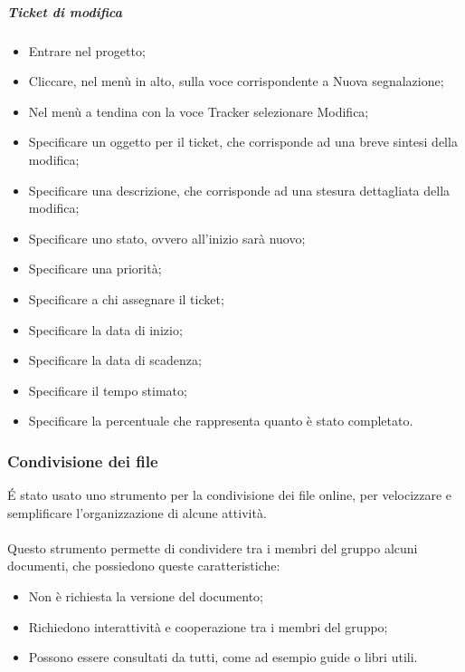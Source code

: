 \subparagraph{Ticket di modifica}
\begin{itemize}
\item Entrare nel progetto;
\item Cliccare, nel menù in alto, sulla voce corrispondente a Nuova segnalazione;
\item Nel menù a tendina con la voce Tracker selezionare Modifica;
\item Specificare un oggetto per il ticket, che corrisponde ad una breve sintesi della modifica;
\item Specificare una descrizione, che corrisponde ad una stesura dettagliata della modifica;
\item Specificare uno stato, ovvero all'inizio sarà nuovo;
\item Specificare una priorità;
\item Specificare a chi assegnare il ticket;
\item Specificare la data di inizio;
\item Specificare la data di scadenza;
\item Specificare il tempo stimato;
\item Specificare la percentuale che rappresenta quanto è stato completato.
\end{itemize}

\subsubsection{Condivisione dei file}
\'E stato usato uno strumento per la condivisione dei file online, per velocizzare e semplificare l'organizzazione di alcune attività.

\paragraph{}
Questo strumento permette di condividere tra i membri del gruppo alcuni documenti, che possiedono queste caratteristiche:
\begin{itemize}
\item Non è richiesta la versione del documento;
\item Richiedono interattività e cooperazione tra i membri del gruppo;
\item Possono essere consultati da tutti, come ad esempio guide o libri utili.
\end{itemize}

